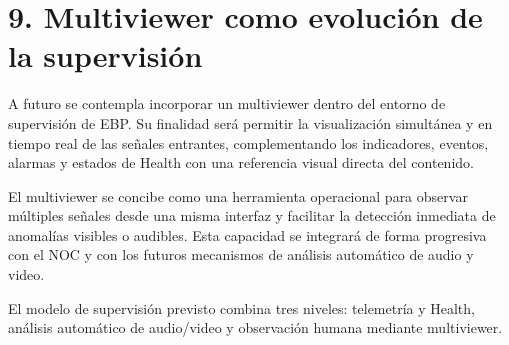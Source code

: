 \section{9. Multiviewer como evolución de la supervisión}
A futuro se contempla incorporar un multiviewer dentro del entorno de supervisión de EBP. Su finalidad será permitir la visualización simultánea y en tiempo real de las señales entrantes, complementando los indicadores, eventos, alarmas y estados de Health con una referencia visual directa del contenido.

El multiviewer se concibe como una herramienta operacional para observar múltiples señales desde una misma interfaz y facilitar la detección inmediata de anomalías visibles o audibles. Esta capacidad se integrará de forma progresiva con el NOC y con los futuros mecanismos de análisis automático de audio y video.

\begin{callout}El modelo de supervisión previsto combina tres niveles: telemetría y Health, análisis automático de audio/video y observación humana mediante multiviewer.\end{callout}
